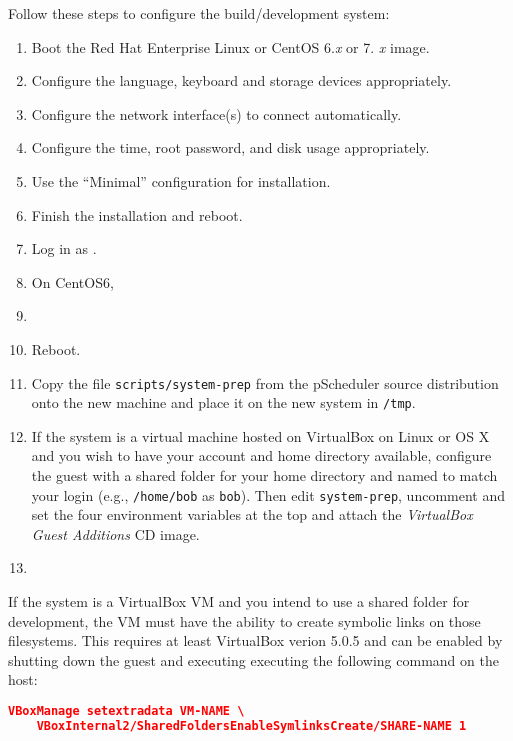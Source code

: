 \documentclass[10pt,titlepage]{article}
\begin{document}
Follow these steps to configure the build/development system:

\begin{enumerate}
\item Boot the Red Hat Enterprise Linux or CentOS 6.{\it x} or 7.{\it
  x} image.
\item Configure the language, keyboard and storage devices
  appropriately.
\item Configure the network interface(s) to connect automatically.
\item Configure the time, root password, and disk usage appropriately.
\item Use the ``Minimal'' configuration for installation.
\item Finish the installation and reboot.
\item Log in as \root.
\item On CentOS6, 
\item {}
\item Reboot.
\item Copy the file {\tt scripts/system-prep} from the pScheduler
  source distribution onto the new machine and place it on the new
  system in {\tt /tmp}.
\item If the system is a virtual machine hosted on VirtualBox on Linux
  or OS X and you wish to have your account and home directory
  available, configure the guest with a shared folder for your home
  directory and named to match your login (e.g., {\tt /home/bob} as
  {\tt bob}).  Then edit {\tt system-prep}, uncomment and set the four
  environment variables at the top and attach the {\it VirtualBox
    Guest Additions} CD image.  
\item {}
\end{enumerate}


If the system is a VirtualBox VM and you intend to use a shared folder
for development, the VM must have the ability to create symbolic links
on those filesystems.  This requires at least VirtualBox verion 5.0.5
and can be enabled by shutting down the guest and executing executing
the following command on the host:

\begin{lstlisting}[language=json,firstnumber=1]
VBoxManage setextradata VM-NAME \
    VBoxInternal2/SharedFoldersEnableSymlinksCreate/SHARE-NAME 1
\end{lstlisting}
\end{document}
